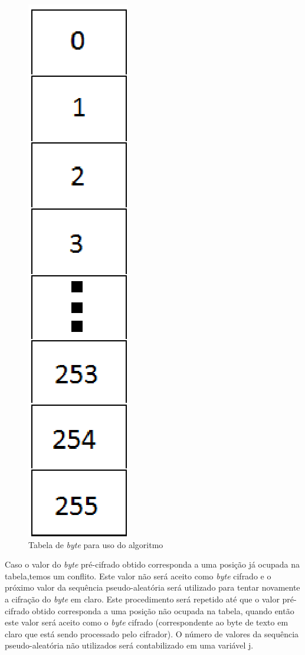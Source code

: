 \begin{figure}[h]
	\centering
	\includegraphics[scale=0.5]{figuras/tabela.eps}
	\caption{Tabela de \textit{byte} para uso do algoritmo}
\end{figure}

Caso o valor do \textit{byte} pré-cifrado obtido corresponda a uma posição já ocupada na tabela,temos um conflito. Este valor não será aceito como \textit{byte} cifrado e o próximo valor da sequência pseudo-aleatória será utilizado para tentar novamente a cifração do \textit{byte} em claro. Este procedimento será repetido até que o valor pré-cifrado obtido corresponda a uma posição não ocupada na tabela, quando então este valor será aceito como o \textit{byte} cifrado (correspondente ao byte de texto em claro que está sendo processado pelo cifrador). O número de valores da sequência pseudo-aleatória não utilizados será contabilizado em uma variável j. 

